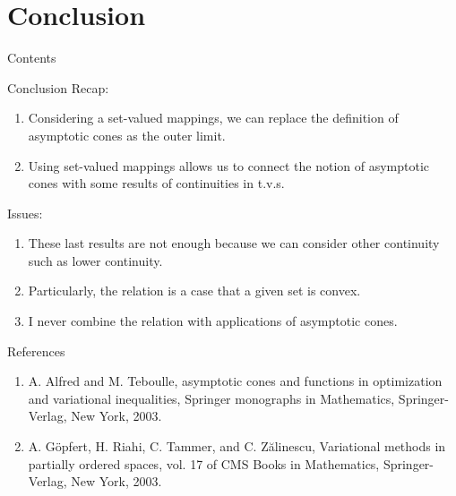 \documentclass[aspectratio=169, dvipdfmx, 11pt]{beamer} %
\newcommand{\SuchThat}{\:\text{s.t.}\:}
\begin{document}



\section{Conclusion}
\begin{frame}{Contents}
  \tableofcontents[currentsection]
\end{frame}

\begin{frame}{Conclusion}
  Recap:
  \begin{enumerate}[]
    \item Considering a set-valued mappings, we can replace the definition of asymptotic cones as the outer limit.
    \item Using set-valued mappings allows us to connect the notion of asymptotic cones with some results of continuities in t.v.s.
  \end{enumerate}
  Issues:
  \begin{enumerate}[]
    \item These last results are not enough because we can consider other continuity such as lower continuity.
    \item Particularly, the relation is a case that a given set is convex.
    \item I never combine the relation with applications of asymptotic cones.
  \end{enumerate}

\end{frame}

\begin{frame}[t]{References}
  \begin{enumerate}[]
    \item A. Alfred and M. Teboulle, asymptotic cones and functions in optimization and variational inequalities, Springer monographs in Mathematics, Springer-Verlag, New York, 2003.
    \item A. G\"{o}pfert, H. Riahi, C. Tammer, and C. Z\u{a}linescu, Variational methods in partially ordered spaces, vol. 17 of CMS Books in Mathematics, Springer-Verlag, New York, 2003.
  \end{enumerate}
\end{frame}
\end{document}
